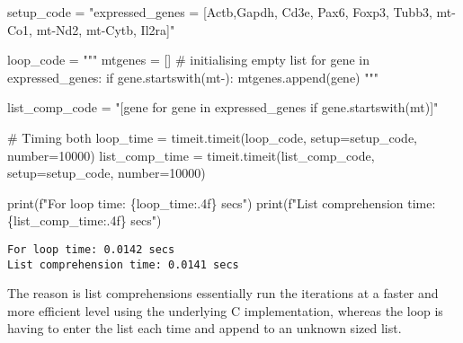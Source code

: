 \documentclass[
  letterpaper,
  DIV=11,
  numbers=noendperiod]{scrartcl}
\newenvironment{Shaded}{\begin{snugshade}}{\end{snugshade}}
\newcommand{\BuiltInTok}[1]{\textcolor[rgb]{0.00,0.23,0.31}{#1}}
\newcommand{\CommentTok}[1]{\textcolor[rgb]{0.37,0.37,0.37}{#1}}
\newcommand{\DecValTok}[1]{\textcolor[rgb]{0.68,0.00,0.00}{#1}}
\newcommand{\NormalTok}[1]{\textcolor[rgb]{0.00,0.23,0.31}{#1}}
\newcommand{\OperatorTok}[1]{\textcolor[rgb]{0.37,0.37,0.37}{#1}}
\newcommand{\SpecialCharTok}[1]{\textcolor[rgb]{0.37,0.37,0.37}{#1}}
\newcommand{\SpecialStringTok}[1]{\textcolor[rgb]{0.13,0.47,0.30}{#1}}
\newcommand{\StringTok}[1]{\textcolor[rgb]{0.13,0.47,0.30}{#1}}
\begin{document}
\begin{Shaded}
\begin{Highlighting}[]
\NormalTok{setup\_code }\OperatorTok{=} \StringTok{"expressed\_genes = [\textquotesingle{}Actb\textquotesingle{},\textquotesingle{}Gapdh\textquotesingle{}, \textquotesingle{}Cd3e\textquotesingle{}, \textquotesingle{}Pax6\textquotesingle{}, \textquotesingle{}Foxp3\textquotesingle{}, \textquotesingle{}Tubb3\textquotesingle{}, \textquotesingle{}mt{-}Co1\textquotesingle{}, \textquotesingle{}mt{-}Nd2\textquotesingle{}, \textquotesingle{}mt{-}Cytb\textquotesingle{}, \textquotesingle{}Il2ra\textquotesingle{}]"}

\NormalTok{loop\_code }\OperatorTok{=} \StringTok{"""}
\StringTok{mtgenes = [] \# initialising empty list}
\StringTok{for gene in expressed\_genes:}
\StringTok{  if gene.startswith(\textquotesingle{}mt{-}\textquotesingle{}):}
\StringTok{    mtgenes.append(gene)}
\StringTok{"""}

\NormalTok{list\_comp\_code }\OperatorTok{=} \StringTok{"[gene for gene in expressed\_genes if gene.startswith(\textquotesingle{}mt\textquotesingle{})]"}


\CommentTok{\# Timing both}
\NormalTok{loop\_time }\OperatorTok{=}\NormalTok{ timeit.timeit(loop\_code, setup}\OperatorTok{=}\NormalTok{setup\_code, number}\OperatorTok{=}\DecValTok{10000}\NormalTok{)}
\NormalTok{list\_comp\_time }\OperatorTok{=}\NormalTok{ timeit.timeit(list\_comp\_code, setup}\OperatorTok{=}\NormalTok{setup\_code, number}\OperatorTok{=}\DecValTok{10000}\NormalTok{)}

\BuiltInTok{print}\NormalTok{(}\SpecialStringTok{f"For loop time: }\SpecialCharTok{\{}\NormalTok{loop\_time}\SpecialCharTok{:.4f\}}\SpecialStringTok{ secs"}\NormalTok{)}
\BuiltInTok{print}\NormalTok{(}\SpecialStringTok{f"List comprehension time: }\SpecialCharTok{\{}\NormalTok{list\_comp\_time}\SpecialCharTok{:.4f\}}\SpecialStringTok{ secs"}\NormalTok{)}
\end{Highlighting}
\end{Shaded}

\begin{verbatim}
For loop time: 0.0142 secs
List comprehension time: 0.0141 secs
\end{verbatim}

The reason is list comprehensions essentially run the iterations at a
faster and more efficient level using the underlying C implementation,
whereas the loop is having to enter the list each time and append to an
unknown sized list.
\end{document}
